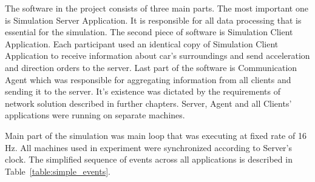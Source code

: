 \documentclass[11pt,english]{article}
\begin{document}
The software in the project consists of three  main parts. The most important one is Simulation Server Application. It is responsible for all data processing that is essential for the simulation. The second piece of software is Simulation Client Application. Each participant used an identical copy of Simulation Client Application to receive information about car's surroundings and send acceleration and direction orders to the server. Last part of the software is Communication Agent which was responsible for aggregating information from all clients and sending it to the server. It's existence was dictated by the requirements of network solution described in further chapters. Server, Agent and all Clients' applications were running on separate machines.

Main part of the simulation was main loop that was executing at fixed rate of 16 Hz. All machines used in experiment were synchronized according to Server's clock. The simplified sequence of events across all applications is described in Table~\ref{table:simple_events}.


\end{document}
